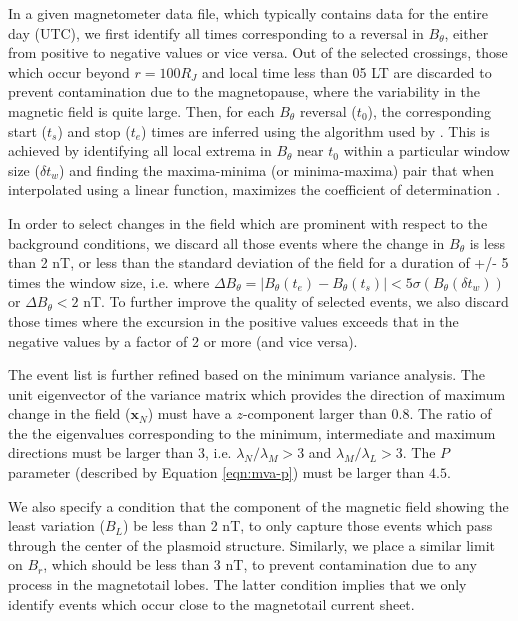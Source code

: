 In a given magnetometer data file, which typically contains data for the entire day (UTC), we first identify all times corresponding to a reversal in $B_\theta$, either from positive to negative values or vice versa. Out of the selected crossings, those which occur beyond $r=100 R_J$ and local time less than 05 LT are discarded to prevent contamination due to the magnetopause, where the variability in the magnetic field is quite large. Then, for each $B_\theta$ reversal ($t_\text{0}$), the corresponding start ($t_s$) and stop ($t_e$) times are inferred using the algorithm used by . This is achieved by identifying all local extrema in $B_\theta$ near $t_0$ within a particular window size ($\delta t_w$) and finding the maxima-minima (or minima-maxima) pair that when interpolated using a linear function, maximizes the coefficient of determination \cite{Smith2017AutomatedIdentification}.

In order to select changes in the field which are prominent with respect to the background conditions, we discard all those events where the change in $B_\theta$ is less than 2 nT, or less than the standard deviation of the field for a duration of +/- 5 times the window size, i.e. where $\Delta B_\theta = |B_\theta(t_e) - B_\theta(t_s)| < 5\sigma ( B_\theta(\delta t_w))$ or $\Delta B_\theta < 2$ nT. To further improve the quality of selected events, we also discard those times where the excursion in the positive values exceeds that in the negative values by a factor of 2 or more (and vice versa). 

The event list is further refined based on the minimum variance analysis. The unit eigenvector of the variance matrix which provides the direction of maximum change in the field ($\mathbf{x}_N$) must have a $z$-component larger than $0.8$. The ratio of the the eigenvalues corresponding to the minimum, intermediate and maximum directions must be larger than 3, i.e. $\lambda_N / \lambda_M > 3$ and $\lambda_M / \lambda_L > 3$. The $P$ parameter (described by Equation \ref{eqn:mva-p}) must be larger than $4.5$. 

We also specify a condition that the component of the magnetic field showing the least variation ($B_L$) be less than 2 nT, to only capture those events which pass through the center of the plasmoid structure. Similarly, we place a similar limit on $B_r$, which should be less than 3 nT, to prevent contamination due to any process in the magnetotail lobes. The latter condition implies that we only identify events which occur close to the magnetotail current sheet.



